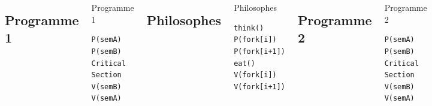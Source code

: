 \section{\sectitle}
\begin{frame}[containsverbatim]{\sectitle}

\begin{columns}[t]
\def\subsectitle{Programme 1}
\subsection{\subsectitle}
\begin{exampleblock}{\subsectitle}
\begin{verbatim}
P(semA)
P(semB)
Critical Section
V(semB)
V(semA)
\end{verbatim}
\end{exampleblock}

\def\subsectitle{Philosophes}
\subsection{\subsectitle}
\begin{exampleblock}{\subsectitle}
\begin{verbatim}
think()
P(fork[i])
P(fork[i+1])
eat()
V(fork[i])
V(fork[i+1])
\end{verbatim}
\end{exampleblock}

\def\subsectitle{Programme 2}
\subsection{\subsectitle}
\begin{exampleblock}{\subsectitle}
\begin{verbatim}
P(semA)
P(semB)
Critical Section
V(semB)
V(semA)
\end{verbatim}
\end{exampleblock}

\end{columns}
\end{frame}



\def\sectitle{Existence d'un deadlock}
